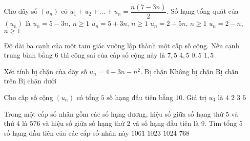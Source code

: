 \begin{ex}%
Cho dãy số $(u_n)$ có $u_1+u_2+\ldots + u_n=\dfrac{n(7-3n)}{2}$. Số hạng tổng quát của $(u_n)$ là
\choice
{\True $u_n=5-3n$, $n\geq 1$}
{$u_n=5+3n$, $n\geq 1$}
{$u_n=2+5n$, $n\geq 1$}
{$u_n=2-n$, $n\geq 1$}
\end{ex}

\begin{ex}%
Độ dài ba cạnh của một tam giác vuông lập thành một cấp số cộng. Nếu cạnh trung bình bằng $6$ thì công sai của cấp số cộng này là
\choice
{$7{,}5$}
{$4{,}5$}
{$0{,}5$}
{\True $1{,}5$}
\end{ex}

\begin{ex}%
Xét tính bị chặn của dãy số $u_{n}=4-3 n-n^{2}$.
\choice
{Bị chặn}
{Không bị chặn}
{\True Bị chặn trên}
{Bị chặn dưới}
\end{ex}

\begin{ex}%
Cho cấp số cộng $\left(u_{n}\right)$ có tổng $5$ số hạng đầu tiên bằng $10$.  Giá trị $u_{3}$ là
\choice
{$4$}
{\True $2$}
{$3$}
{$5$}
\end{ex}

\begin{ex}%
Trong một cấp số nhân gồm các số hạng dương, hiệu số giữa số hạng thứ $ 5 $ và thứ $ 4 $ là $ 576 $ và hiệu số giữa số hạng  thứ $ 2 $ và số hạng đầu tiên là $ 9 $. Tìm tổng $ 5 $ số hạng đầu tiên của các cấp số nhân này
\choice
{$ 1061 $}
{\True $ 1023 $}
{$ 1024 $}
{$ 768 $}
\end{ex}

